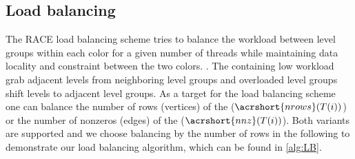   \subsection{Load balancing}\label{subsec:LB} 
The RACE load balancing scheme tries to balance the workload between level groups 
within each color for a given number of threads while maintaining data locality 
and \DK constraint between the two colors. . 
The \levelGroups containing low workload grab adjacent levels from neighboring level groups and overloaded level groups shift levels to adjacent level groups. As a target for the load balancing scheme one can balance the number of rows (\ie vertices) of the \levelGroups ($\acrshort{nrows}(T(i))$)  or the number of nonzeros (\ie edges) of the \levelGroups ($\acrshort{nnz}(T(i))$). Both variants are supported and we choose balancing by the number of rows in the following to demonstrate our load balancing algorithm, which can be found in \cref{alg:LB}.
 
